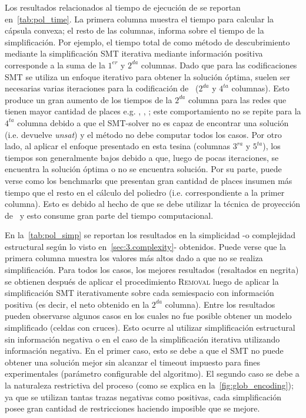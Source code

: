 Los resultados relacionados al tiempo de ejecución de \pachtool se reportan en~\autoref{tab:pol_time}.
La primera columna muestra el tiempo para calcular la cápsula convexa; el resto de las columnas, informa
sobre el tiempo de la simplificación. Por ejemplo, el tiempo total de \pachtool como método de descubrimiento
mediante la simplificación SMT iterativa mediante información positiva corresponde a la suma de la $1^{er}$ y $2^{da}$ columnas.
Dado que para las codificaciones SMT se utiliza un enfoque iterativo para obtener la solución óptima,
suelen ser necesarias varias iteraciones para la codificación de~\cite{LeonCB15} ($2^{da}$ y $4^{ta}$ columnas). 
Esto produce un gran aumento de los tiempos de la $2^{da}$ columna para las redes que tienen mayor cantidad de places
e.g. , , ; este comportamiento no se repite para la $4^{ta}$ columna
debido a que el SMT-solver no es capaz de encontrar una solución (i.e. devuelve \emph{unsat}) y el método no debe computar todos los casos.
Por otro lado, al aplicar el enfoque presentado en esta tesina (columnas $3^{ra}$ y $5^{ta}$), los tiempos son 
generalmente bajos debido a que, luego de pocas iteraciones, se encuentra la solución óptima o no se encuentra solución.
Por su parte, puede verse como los benchmarks que presentan gran cantidad de places insumen más tiempo que el resto
en el cálculo del poliedro (i.e. correspondiente a la primer columna). Esto es debido al hecho de que se debe
utilizar la técnica de proyección de~\cite{CarmonaC14} y esto consume gran parte del tiempo computacional.




En la~\autoref{tab:pol_simp} se reportan los resultados en la simplicidad -o complejidad estructural
según lo visto en~\autoref{sec:3.complexity}- obtenidos. 
Puede verse que la primera columna muestra los valores más altos dado a que no se realiza simplificación.
Para todos los casos, los mejores resultados (resaltados en negrita) se obtienen después de aplicar el 
procedimiento \textsc{Removal} luego de aplicar la simplificación SMT iterativamente sobre cada semiespacio
con información positiva (es decir, el neto obtenido en la $2^{da}$ columna). 
Entre los resultados pueden observarse algunos casos en los cuales no fue posible obtener
un modelo simplificado (celdas con cruces). Esto ocurre al utilizar simplificación estructural 
sin información negativa o en el caso de la simplificación iterativa utilizando información negativa.
En el primer caso, esto se debe a que el SMT no puede obtener una solución mejor sin alcanzar el timeout impuesto
para fines experimentales (parámetro configurable del algoritmo). El segundo caso se debe a la naturaleza restrictiva
del proceso (como se explica en la~\autoref{fig:glob_encoding}); ya que se utilizan tantas trazas negativas como positivas,
cada simplificación posee gran cantidad de restricciones haciendo imposible que se mejore.

